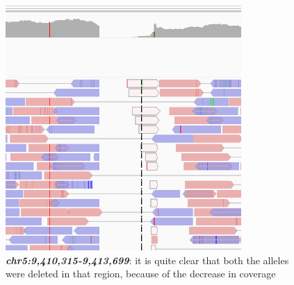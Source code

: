 \begin{figure}[H]
    \caption{\textbf{\textit{chr5:9,410,315-9,413,699}}: it is quite clear that
    both the alleles were deleted in that region, because of the decrease in
    coverage}
    \centering
    \includegraphics[width=0.8\textwidth]{pos2.PNG}
\end{figure}

